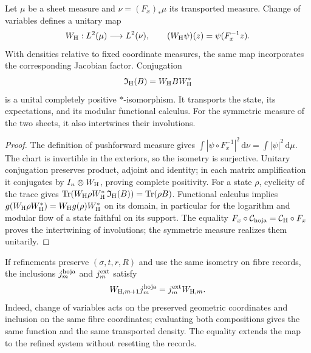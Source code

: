 \begin{proposition}
\label{vii:vii:prop:transporte-unitario-horizonte}
Let \(\mu\) be a sheet measure and \(\nu=(F_x)_*\mu\) its
transported measure. Change of variables defines a unitary map
\begin{equation}
 W_{\rm H}:L^2(\mu)\longrightarrow L^2(\nu),\qquad
 (W_{\rm H}\psi)(z)=\psi(F_x^{-1}z).
 \label{vii:vii:eq:unitaria-horizonte}
\end{equation}
With densities relative to fixed coordinate measures, the same
map incorporates the corresponding Jacobian factor.
Conjugation
\begin{equation}
 \mathfrak I_{\rm H}(B)=W_{\rm H}BW_{\rm H}^*
 \label{vii:vii:eq:mapa-observables-horizonte}
\end{equation}
is a unital completely positive \(*\)-isomorphism. It transports the
state, its expectations, and its modular functional calculus. For the
symmetric measure of the two sheets, it also intertwines their involutions.
\end{proposition}
\begin{proof}
The definition of pushforward measure gives
\(\int|\psi\circ F_x^{-1}|^2\,\mathrm d\nu
=\int|\psi|^2\,\mathrm d\mu\).
The chart is invertible in the exteriors, so the isometry is
surjective. Unitary conjugation preserves product, adjoint and
identity; in each matrix amplification it conjugates by
\(I_n\otimes W_{\rm H}\), proving complete positivity.
For a state \(\rho\), cyclicity of the trace gives
\(\operatorname{Tr}(W_{\rm H}\rho W_{\rm H}^*
\,\mathfrak I_{\rm H}(B))=\operatorname{Tr}(\rho B)\).
Functional calculus implies
\(g(W_{\rm H}\rho W_{\rm H}^*)=W_{\rm H}g(\rho)W_{\rm H}^*\)
on its domain, in particular for the logarithm and modular flow of
a state faithful on its support. The equality
\(F_x\circ\mathcal C_{\rm hoja}=\mathcal C_{\rm H}\circ F_x\)
proves the intertwining of involutions; the symmetric measure realizes them
unitarily.
\end{proof}

If refinements preserve \((\sigma,t,r,R)\) and use the same
isometry on fibre records, the inclusions
\(j_m^{\rm hoja}\) and \(j_m^{\rm ext}\) satisfy
\begin{equation}
 W_{{\rm H},m+1}j_m^{\rm hoja}
 =j_m^{\rm ext}W_{{\rm H},m}.
 \label{vii:vii:eq:naturalidad-horizonte}
\end{equation}
Indeed, change of variables acts on the preserved geometric coordinates
and inclusion on the same fibre coordinates; evaluating
both compositions gives the same function and the same transported density.
The equality extends the map to the refined system without resetting the records.

